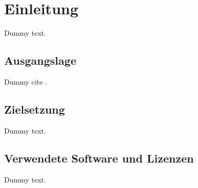 \chapter{Einleitung}

Dummy text.

\section{Ausgangslage}

Dummy cite \cite{bringhurst1996ets}.

\section{Zielsetzung}

Dummy text.

\section{Verwendete Software und Lizenzen}

Dummy text.
